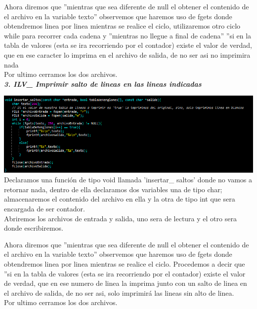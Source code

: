 \documentclass[12pt,letterpaper]{report}
\begin{document}
Ahora diremos que ''mientras que sea diferente de null el obtener el contenido de el archivo en la variable texto'' observemos que haremos uso de fgets donde obtendremos linea por linea mientras se realice el ciclo, utilizaremos otro ciclo while para recorrer cada cadena y ''mientras no llegue a final de cadena'' ''si en la tabla de valores (esta se ira recorriendo por el contador) existe el valor de verdad, que en ese caracter lo imprima en el archivo de salida, de no ser asi no imprimira nada\\
Por ultimo cerramos los dos archivos.\\


\textbf{\textit{ 3. ILV\_  Imprimir salto de lineas en las lineas indicadas}}\\
\begin{multicols}{2}

\includegraphics[scale=0.4]{punto3}
Declaramos una función de tipo void llamada 'insertar\_ saltos' donde no vamos a retornar nada, dentro de ella declaramos dos variables una de tipo char; almacenaremos el contenido del archivo en ella y la otra de tipo int que sera encargada de ser contador.\\
Abriremos los archivos de entrada y salida, uno sera de lectura y el otro sera donde escribiremos.\\
\end{multicols}
Ahora diremos que ''mientras que sea diferente de null el obtener el contenido de el archivo en la variable texto'' observemos que haremos uso de fgets donde obtendremos linea por linea mientras se realice el ciclo. Procedemos a decir que ''si en la tabla de valores (esta se ira recorriendo por el contador) existe el valor de verdad, que en ese numero de linea la imprima junto con un salto de linea en el archivo de salida, de no ser asi, solo imprimirá las lineas sin alto de linea.\\ 
Por ultimo cerramos los dos archivos.\\
\end{document}
